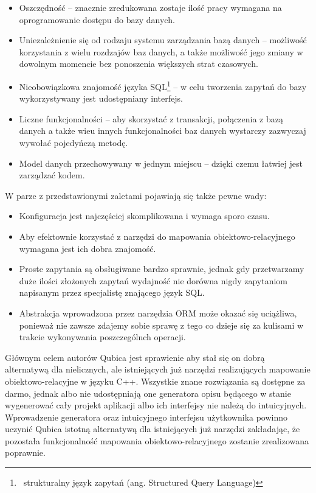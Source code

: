 \documentclass[12pt]{report}
\begin{document}
\begin{itemize}
\item Oszczędność -- znacznie zredukowana zostaje ilość pracy wymagana na oprogramowanie dostępu do bazy danych.
\item Uniezależnienie się od rodzaju systemu zarządzania bazą danych -- możliwość korzystania z wielu rozdzajów baz danych, a także możliwość jego zmiany w dowolnym
momencie bez ponoszenia większych strat czasowych.
\item Nieobowiązkowa znajomość języka SQL\footnote{~strukturalny język zapytań (ang. Structured Query Language)} -- w celu tworzenia zapytań do bazy wykorzystywany
jest udostępniany interfejs.
\item Liczne funkcjonalności -- aby skorzystać z transakcji, połączenia z bazą danych a także wieu innych funkcjonalności baz danych wystarczy zazwyczaj wywołać
pojedyńczą metodę.
\item Model danych przechowywany w jednym miejscu -- dzięki czemu łatwiej jest zarządzać kodem.
\end{itemize}

W parze z przedstawionymi zaletami pojawiają się także pewne wady:

\begin{itemize}
\item Konfiguracja jest najczęściej skomplikowana i wymaga sporo czasu.
\item Aby efektownie korzystać z narzędzi do mapowania obiektowo-relacyjnego wymagana jest ich dobra znajomość.
\item Proste zapytania są obsługiwane bardzo sprawnie, jednak gdy przetwarzamy duże ilości złożonych zapytań wydajność nie dorówna nigdy zapytaniom na\-pi\-sa\-nym
przez specjalistę znającego język SQL.
\item Abstrakcja wprowadzona przez narzędzia ORM może okazać się uciążliwa, ponieważ nie zawsze zdajemy sobie sprawę z tego co dzieje się za kulisami w trakcie
wykonywania poszczególnch operacji.
\end{itemize}

Głównym celem autorów Qubica jest sprawienie aby stał się on dobrą alternaty\-wą dla nielicznych, ale istniejących już narzędzi realizujących mapowanie obiekt\-owo-relacyjne 
w języku C++. Wszystkie znane rozwiązania są dostępne za darmo, jednak albo nie udostępniają one generatora opisu będącego w stanie  wygenerować cały projekt aplikacji
albo ich interfejsy nie należą do intuicyjnych. Wprowadzenie generatora oraz intuicyjnego interfejsu użytkownika powinno uczynić Qubica istotną alternatywą dla istniejących już
narzędzi za\-kła\-da\-jąc, że pozostała funkcjonalność mapowania obiektowo-relacyjnego zostanie zre\-al\-iz\-owana poprawnie.
\end{document}
